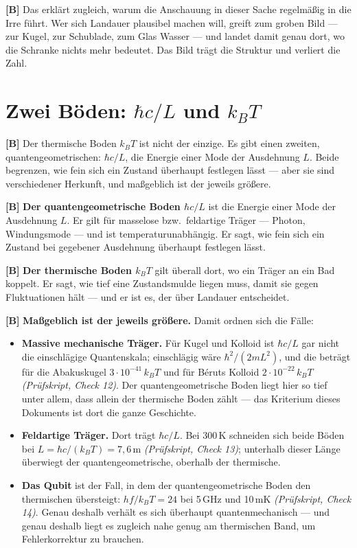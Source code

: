 \textbf{[B]} Das erklärt zugleich, warum die Anschauung in dieser Sache regelmäßig in die
Irre führt. Wer sich Landauer plausibel machen will, greift zum groben Bild ---
zur Kugel, zur Schublade, zum Glas Wasser --- und landet damit genau dort, wo die
Schranke nichts mehr bedeutet. Das Bild trägt die Struktur und verliert die Zahl.

\section{Zwei Böden: $\hbar c/L$ und $k_BT$}
\label{sec:zweiboeden}

\textbf{[B]} Der thermische Boden $k_BT$ ist nicht der einzige. Es gibt einen zweiten,
quantengeometrischen: $\hbar c/L$, die Energie einer Mode der Ausdehnung $L$.
Beide begrenzen, wie fein sich ein Zustand überhaupt festlegen lässt --- aber sie
sind verschiedener Herkunft, und maßgeblich ist der jeweils größere.

\textbf{[B]} \textbf{Der quantengeometrische Boden $\hbar c/L$} ist die Energie einer Mode
der Ausdehnung $L$. Er gilt für masselose bzw.\ feldartige Träger --- Photon,
Windungsmode --- und ist temperaturunabhängig. Er sagt, wie fein sich ein Zustand
bei gegebener Ausdehnung überhaupt festlegen lässt.

\textbf{[B]} \textbf{Der thermische Boden $k_BT$} gilt überall dort, wo ein Träger an ein
Bad koppelt. Er sagt, wie tief eine Zustandsmulde liegen muss, damit sie gegen
Fluktuationen hält --- und er ist es, der über Landauer entscheidet.

\textbf{[B]} \textbf{Maßgeblich ist der jeweils größere.} Damit ordnen sich die Fälle:

\begin{itemize}[leftmargin=1.4em,itemsep=0.3em]
  \item \textbf{Massive mechanische Träger.} Für Kugel und Kolloid ist
        $\hbar c/L$ gar nicht die einschlägige Quantenskala; einschlägig wäre
        $\hbar^2/(2mL^2)$, und die beträgt für die Abakuskugel
        $3\cdot10^{-41}\,k_BT$ und für Béruts Kolloid $2\cdot10^{-22}\,k_BT$
        \emph{(Prüfskript, Check 12)}. Der quantengeometrische Boden liegt hier so tief unter
        allem, dass allein der thermische Boden zählt --- das Kriterium dieses
        Dokuments ist dort die ganze Geschichte.
  \item \textbf{Feldartige Träger.} Dort trägt $\hbar c/L$. Bei 300\,K schneiden
        sich beide Böden bei $L = \hbar c/(k_BT) = 7{,}6\,$\textmu m
        \emph{(Prüfskript, Check 13)}; unterhalb dieser Länge überwiegt der
        quantengeometrische, oberhalb der thermische.
  \item \textbf{Das Qubit} ist der Fall, in dem der quantengeometrische Boden den
        thermischen übersteigt: $hf/k_BT = 24$ bei 5\,GHz und 10\,mK
        \emph{(Prüfskript, Check 14)}. Genau deshalb verhält es sich überhaupt
        quantenmechanisch --- und genau deshalb liegt es zugleich nahe genug am
        thermischen Band, um Fehlerkorrektur zu brauchen.
\end{itemize}

